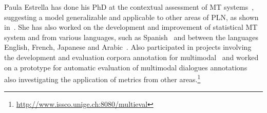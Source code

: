 
Paula Estrella has done his PhD at the contextual assessment of MT
systems~\cite{estr:impr08,estr:femt09}, suggesting a model generalizable and
applicable to other areas of PLN, as shown in~\cite{Miller2008}. She has also
worked on the development and improvement of
statistical MT system and from various languages, such as
Spanish~\cite{estr:expe05} and between the languages English, French, Japanese
and Arabic~\cite{rayner-EtAl:2009:GEAF}. Also participated in projects involving
the development and evaluation
corpora annotation for multimodal~\cite{pope:estr07} and worked on
a prototype for automatic evaluation of multimodal dialogues
annotations~\cite{multieval} also investigating the application of metrics from
other areas.\footnote{\url{http://www.issco.unige.ch:8080/multieval}}


